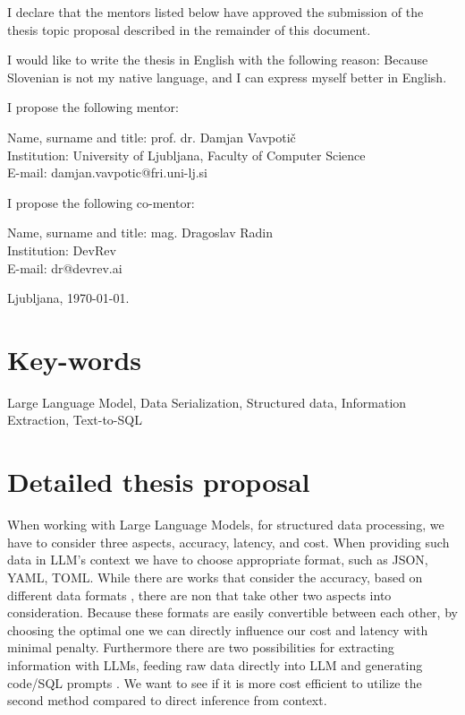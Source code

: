 \documentclass[a4paper, 12pt]{article}
\begin{document}
I declare that the mentors listed below have approved the submission of the thesis topic proposal described in the remainder of this document.

I would like to write the thesis in English with the following reason: Because Slovenian is not my native language, and I can express myself better in English.

I propose the following mentor:

\hfill\begin{minipage}{\dimexpr\textwidth-2cm}
Name, surname and title: prof. dr. Damjan Vavpotič\\
Institution: University of Ljubljana, Faculty of Computer Science \\
E-mail: damjan.vavpotic@fri.uni-lj.si
\end{minipage}

I propose the following co-mentor:

\hfill\begin{minipage}{\dimexpr\textwidth-2cm}
Name, surname and title: mag. Dragoslav Radin\\
Institution: DevRev \\
E-mail: dr@devrev.ai
\end{minipage}

\bigskip

\hfill Ljubljana, \today. \newpage


\section*{Key-words}
Large Language Model, Data Serialization, Structured data, Information Extraction, Text-to-SQL
 
\section*{Detailed thesis proposal}

\ProblemParagraph 
When working with Large Language Models, for structured data processing, we have to consider three aspects, accuracy, latency, and cost. When providing such data in LLM's context we have to choose appropriate format, such as JSON, YAML, TOML. While there are works that consider the accuracy, based on different data formats \cite{struct-text-eval}, there are non that take other two aspects into consideration. Because these formats are easily convertible between each other, by choosing the optimal one we can directly influence our cost and latency with minimal penalty. Furthermore there are two possibilities for extracting information with LLMs, feeding raw data directly into LLM \cite{struct-text-eval} and generating code/SQL prompts \cite{gao2023text, li2023can, gao2023pal}. We want to see if it is more cost efficient to utilize the second method compared to direct inference from context. 
\end{document}
